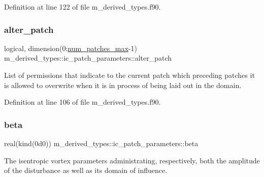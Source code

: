 Definition at line 122 of file m\+\_\+derived\+\_\+types.\+f90.

\mbox{\label{structm__derived__types_1_1ic__patch__parameters_af75434fb4f9966ac0cbc54e50a42f1c6}} 
\subsubsection{\texorpdfstring{alter\+\_\+patch}{alter\_patch}}
{\footnotesize\ttfamily logical, dimension(0\+:\hyperlink{namespacem__derived__types_a0e61503f10c4338737b8d61e9109e396}{num\+\_\+patches\+\_\+max}-\/1) m\+\_\+derived\+\_\+types\+::ic\+\_\+patch\+\_\+parameters\+::alter\+\_\+patch}



List of permissions that indicate to the current patch which preceding patches it is allowed to overwrite when it is in process of being laid out in the domain. 



Definition at line 106 of file m\+\_\+derived\+\_\+types.\+f90.

\mbox{\label{structm__derived__types_1_1ic__patch__parameters_a11c5827ce1fa54cadd2996c9ccd2fe31}} 
\subsubsection{\texorpdfstring{beta}{beta}}
{\footnotesize\ttfamily real(kind(0d0)) m\+\_\+derived\+\_\+types\+::ic\+\_\+patch\+\_\+parameters\+::beta}



The isentropic vortex parameters administrating, respectively, both the amplitude of the disturbance as well as its domain of influence. 



